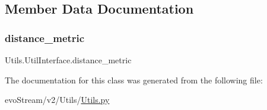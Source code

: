 \subsection{Member Data Documentation}
\mbox{\label{classUtils_1_1UtilInterface_a4f27f45ae8e2c27850bc1b4ea1dd018a}} 
\subsubsection{\texorpdfstring{distance\+\_\+metric}{distance\_metric}}
{\footnotesize\ttfamily Utils.\+Util\+Interface.\+distance\+\_\+metric}



The documentation for this class was generated from the following file\+:\begin{DoxyCompactItemize}
\item 
evo\+Stream/v2/\+Utils/\hyperlink{v2_2Utils_2Utils_8py}{Utils.\+py}\end{DoxyCompactItemize}
